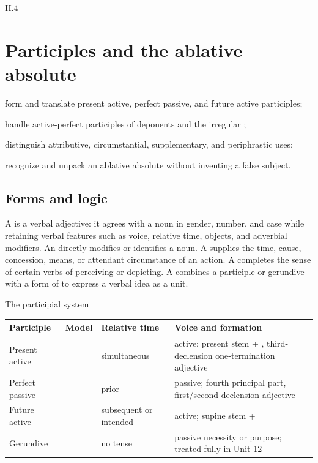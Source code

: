 \begin{courseunit}{II.4}
\chapter{Participles and the ablative absolute}

\begin{learningobjectives}
  \item form and translate present active, perfect passive, and future active participles;
  \item handle active-perfect participles of deponents and the irregular ;
  \item distinguish attributive, circumstantial, supplementary, and periphrastic uses;
  \item recognize and unpack an ablative absolute without inventing a false subject.
\end{learningobjectives}

\section{Forms and logic}

A  is a verbal adjective: it agrees with a noun in gender,
number, and case while retaining verbal features such as voice, relative time,
objects, and adverbial modifiers. An  directly
modifies or identifies a noun. A  supplies the
time, cause, concession, means, or attendant circumstance of an action. A
 completes the sense of certain verbs of
perceiving or depicting. A  combines a participle or
gerundive with a form of  to express a verbal idea as a unit.

\begin{grammarbox}{The participial system}
\begin{tabularx}{\linewidth}{@{}P{1.25in}P{1.55in}P{1.15in}Y@{}}
\toprule
\textbf{Participle} & \textbf{Model} & \textbf{Relative time} & \textbf{Voice and formation}\\ \midrule
Present active &  & simultaneous & active; present stem +
, third-declension one-termination adjective\\
Perfect passive &  & prior & passive; fourth principal part,
first/second-declension adjective\\
Future active &  & subsequent or intended & active; supine stem +
\\
Gerundive &  & no tense & passive necessity or purpose; treated fully
in Unit 12\\
\bottomrule
\end{tabularx}


\end{grammarbox}
\end{courseunit}
